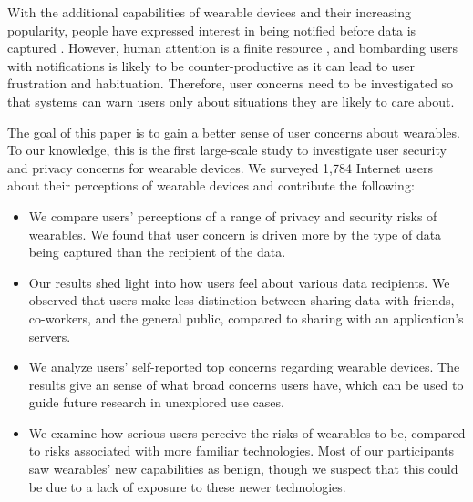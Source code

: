 With the additional capabilities of wearable devices and their increasing popularity, people have expressed interest in being notified before data is captured \cite{denning2014situ}. However, human attention is a finite resource \cite{bohme2011security}, and bombarding users with notifications is likely to be counter-productive as it can lead to user frustration and habituation. Therefore, user concerns need to be investigated so that systems can warn users only about situations they are likely to care about.

The goal of this paper is to gain a better sense of user concerns about wearables. To our knowledge, this is the first large-scale study to investigate user security and privacy concerns for wearable devices. We surveyed 1,784 Internet users about their perceptions of wearable devices and contribute the following: \\[-0.8cm]

\begin{itemize} \itemsep1pt \parskip0pt 
\item We compare users' perceptions of a range of privacy and security risks of wearables. We found that user concern is driven more by the type of data being captured than the recipient of the data.
\item Our results shed light into how users feel about various data recipients. We observed that users make less distinction between sharing data with friends, co-workers, and the general public, compared to sharing with an application's servers.
\item We analyze users' self-reported top concerns regarding wearable devices. The results give an sense of what broad concerns users have, which can be used to guide future research in unexplored use cases. 
\item We examine how serious users perceive the risks of wearables to be, compared to risks associated with more familiar technologies. Most of our participants saw wearables' new capabilities as benign, though we suspect that this could be due to a lack of exposure to these newer technologies.
\end{itemize}
